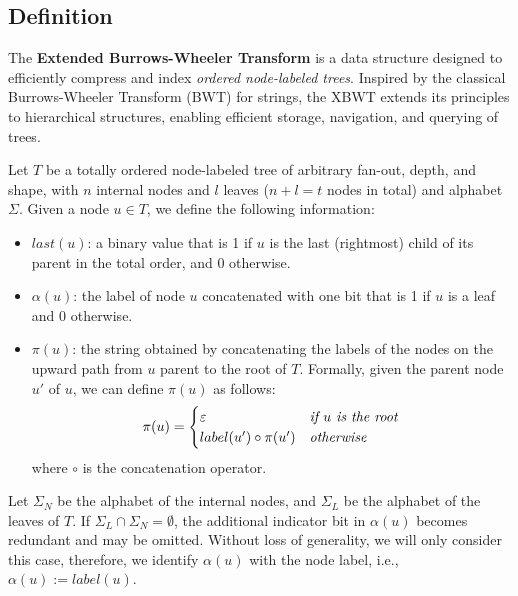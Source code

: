 \subsection{Definition}
The \textbf{Extended Burrows-Wheeler Transform} is a data structure designed to efficiently compress and index \emph{ordered node-labeled trees}. Inspired by the classical Burrows-Wheeler Transform (BWT) \cite{burrows1994block} for strings, the XBWT extends its principles to hierarchical structures, enabling efficient storage, navigation, and querying of trees. %

\begin{definition}
    \label{def:node_informations}
    Let $T$ be a totally ordered node-labeled tree of arbitrary fan-out, depth, and shape, with $n$ internal nodes and $l$ leaves ($n + l = t$ nodes in total) and alphabet $\Sigma$. Given a node $u \in T$, we define the following information:
    \begin{itemize}
        \item $last(u)$: a binary value that is 1 if $u$ is the last (rightmost) child of its parent in the total order, and 0 otherwise.
        \item $\alpha(u)$: the label of node $u$ concatenated with one bit that is 1 if $u$ is a leaf and 0 otherwise.
        \item $\pi(u)$: the string obtained by concatenating the labels of the nodes on the upward path from $u$ parent to the root of $T$. Formally, given the parent node $u'$ of $u$, we can define $\pi(u)$ as follows:
        \begin{align*}
            \pi(u) = \begin{cases}
                \varepsilon & \text{\emph{if $u$ is the root}} \\
                label(u') \circ \pi(u') & \text{\emph{otherwise}}
            \end{cases}
        \end{align*}
        where $\circ$ is the concatenation operator.
    \end{itemize}
\end{definition}
Let $\Sigma_N$ be the alphabet of the internal nodes, and $\Sigma_L$ be the alphabet of the leaves of $T$.
If $\Sigma_L \cap \Sigma_N = \emptyset$, the additional indicator bit in $\alpha(u)$ becomes redundant and may be omitted.
Without loss of generality, we will only consider this case, therefore, we identify $\alpha(u)$ with the node label, i.e., $\alpha(u) := label(u)$.

